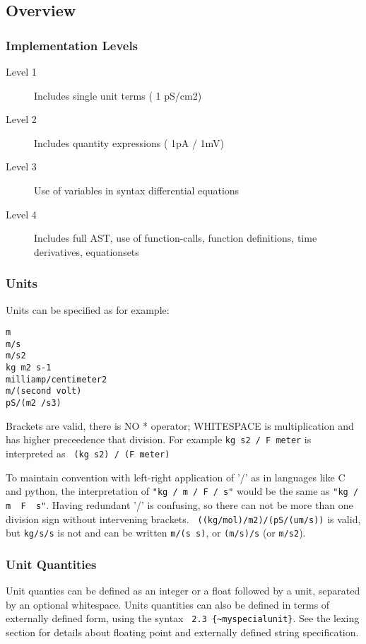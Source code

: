 \documentclass{article}
\begin{document}
\subsection{Overview}



\subsubsection{Implementation Levels}
\begin{description}
\item[Level 1]
Includes single unit terms ( 1 pS/cm2)
\item[Level 2]
Includes quantity expressions ( 1pA / 1mV)
\item[Level 3]
Use of variables in {} syntax
differential equations
\item[Level 4]
Includes full AST, use of function-calls, function definitions, time derivatives, equationsets
\end{description}

\subsubsection*{Units}
Units can be specified as for example:
\begin{verbatim}
m
m/s 
m/s2 
kg m2 s-1
milliamp/centimeter2
m/(second volt) 
pS/(m2 /s3)
\end{verbatim}

Brackets are valid, there is NO * operator; WHITESPACE is multiplication and has higher preceedence that division. For example
\verb|kg s2 / F meter| is interpreted as \verb| (kg s2) / (F meter)|

To maintain convention with left-right  application of '/' as in languages like C and python, the interpretation of  \verb|"kg / m / F / s"| would be the same as \verb|"kg / m  F  s"|. Having redundant '/' is confusing, so there can not be more than one division sign without intervening brackets.
\verb| ((kg/mol)/m2)/(pS/(um/s))| is valid, but \verb|kg/s/s| is not and can be written \verb|m/(s s)|, or \verb|(m/s)/s| (or \verb|m/s2|).


\subsubsection*{Unit Quantities}

Unit quanties can be defined as an integer or a float followed by a unit, separated by an optional whitespace. 
Units quantities can also be defined in terms of externally defined form, using the syntax
\verb| 2.3 {~myspecialunit}|.  See the lexing section for details about floating point and externally defined string specification.
\end{document}

